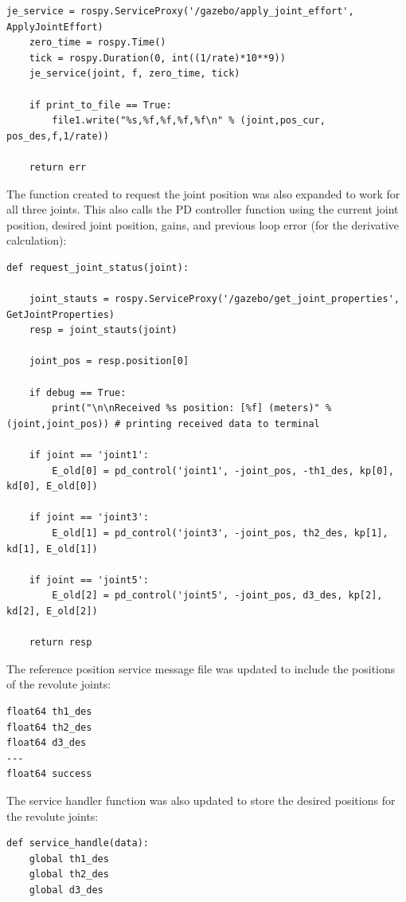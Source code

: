 \documentclass[10pt]{article}
\begin{document}
\begin{enumerate}
\begin{lstlisting}[style=Matlab-editor,basicstyle=\mlttfamily,escapechar=`]
	je_service = rospy.ServiceProxy('/gazebo/apply_joint_effort', ApplyJointEffort)
	zero_time = rospy.Time()
	tick = rospy.Duration(0, int((1/rate)*10**9))
	je_service(joint, f, zero_time, tick)
	
	if print_to_file == True:
		file1.write("%s,%f,%f,%f,%f\n" % (joint,pos_cur, pos_des,f,1/rate)) 
	
	return err
\end{lstlisting} 

	The function created to request the joint position was also expanded to work for all three joints. This also calls the PD controller function using the current joint position, desired joint position, gains, and previous loop error (for the derivative calculation):
		
\begin{lstlisting}[style=Matlab-editor,basicstyle=\mlttfamily,escapechar=`]
def request_joint_status(joint):

	joint_stauts = rospy.ServiceProxy('/gazebo/get_joint_properties', GetJointProperties)
	resp = joint_stauts(joint)
	
	joint_pos = resp.position[0]
	
	if debug == True:
		print("\n\nReceived %s position: [%f] (meters)" % (joint,joint_pos)) # printing received data to terminal
	
	if joint == 'joint1':
		E_old[0] = pd_control('joint1', -joint_pos, -th1_des, kp[0], kd[0], E_old[0])
	
	if joint == 'joint3':
		E_old[1] = pd_control('joint3', -joint_pos, th2_des, kp[1], kd[1], E_old[1])
	
	if joint == 'joint5':
		E_old[2] = pd_control('joint5', -joint_pos, d3_des, kp[2], kd[2], E_old[2])
	
	return resp
\end{lstlisting} 

	The reference position service message file was updated to include the positions of the revolute joints:
	
\begin{lstlisting}[style=Matlab-editor,basicstyle=\mlttfamily,escapechar=`]
float64 th1_des
float64 th2_des
float64 d3_des
---
float64 success
\end{lstlisting}

	The service handler function was also updated to store the desired positions for the revolute joints:
	
\begin{lstlisting}[style=Matlab-editor,basicstyle=\mlttfamily,escapechar=`]
def service_handle(data):
	global th1_des
	global th2_des
	global d3_des
	

\end{lstlisting}
\end{enumerate}
\end{document}

